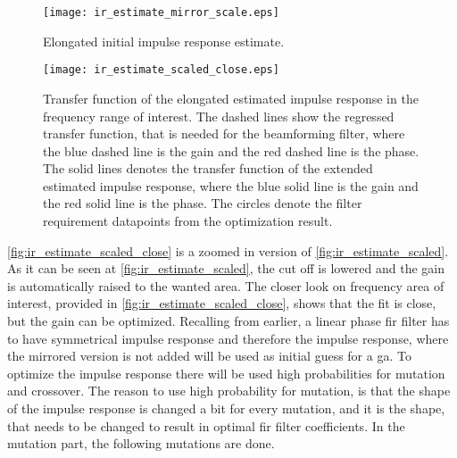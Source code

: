 \begin{figure}[H]
	\centering
	\texttt{[image: ir\_estimate\_mirror\_scale.eps]}
	\caption{Elongated initial impulse response estimate.}
		\label{fig:ir_estimate_mirror_scale}
\end{figure}




\begin{figure}[H]
	\centering
	\texttt{[image: ir\_estimate\_scaled\_close.eps]}
	\caption{Transfer function of the elongated estimated impulse response in the frequency range of interest. The dashed lines show the regressed transfer function, that is needed for the beamforming filter,  where the blue dashed line is the gain and the red dashed line is the phase. The solid lines denotes the transfer function of the extended estimated impulse response, where the blue solid line is the gain and the red solid line is the phase. The circles denote the filter requirement datapoints from the optimization result.}
		\label{fig:ir_estimate_scaled_close}
\end{figure}

\autoref{fig:ir_estimate_scaled_close} is a zoomed in version of \autoref{fig:ir_estimate_scaled}.
As it can be seen at \autoref{fig:ir_estimate_scaled}, the cut off is lowered and the gain is automatically raised to the wanted area. The closer look on frequency area of interest, provided in \autoref{fig:ir_estimate_scaled_close}, shows that the fit is close, but the gain can be optimized. Recalling from earlier, a linear phase \gls{fir} filter has to have symmetrical impulse response and therefore the impulse response, where the mirrored version is not added will be used as initial guess for a \gls{ga}. To optimize the impulse response there will be used high probabilities for mutation and crossover. The reason to use high probability for mutation, is that the shape of the impulse response is changed a bit for every mutation, and it is the shape, that needs to be changed to result in optimal \gls{fir} filter coefficients. In the mutation part, the following mutations are done.

